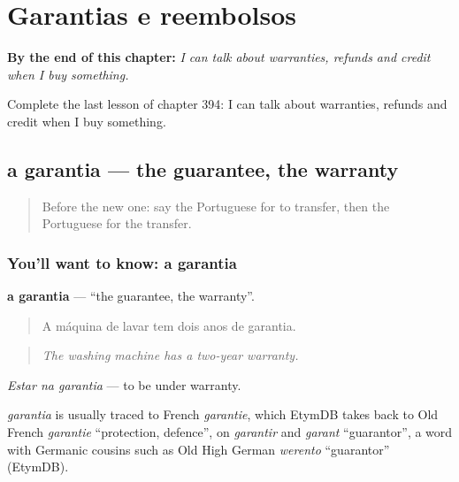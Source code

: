 
\chapter{Garantias e reembolsos}
\label{ch:pt-garantias-e-reembolsos}

\begin{chapteropening}
\textbf{By the end of this chapter:} \emph{I can talk about warranties, refunds and credit when I buy something.}

Complete the last lesson of chapter 394: I can talk about warranties, refunds and credit when I buy something.
\end{chapteropening}

\section[a garantia]{a garantia — the guarantee, the warranty}

\label{lesson:PT-C394-garantia}



\begin{quote}
Before the new one: say the Portuguese for to transfer, then the Portuguese for the transfer.
\end{quote}

\subsection*{You'll want to know: a garantia}
\textbf{a garantia} — \textquotedblleft{}the guarantee, the warranty\textquotedblright{}.

\begin{quote}
A máquina de lavar tem dois anos de garantia.
\end{quote}

\begin{quote}
\emph{The washing machine has a two-year warranty.}
\end{quote}

\emph{Estar na garantia} — to be under warranty.

\begin{cousinweb}
\emph{garantia} is usually traced to French \emph{garantie}, which EtymDB takes back to Old French \emph{garantie} \textquotedblleft{}protection, defence\textquotedblright{}, on \emph{garantir} and \emph{garant} \textquotedblleft{}guarantor\textquotedblright{}, a word with Germanic cousins such as Old High German \emph{werento} \textquotedblleft{}guarantor\textquotedblright{} (EtymDB).
\end{cousinweb}


